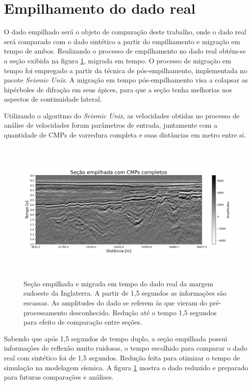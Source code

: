\documentclass[
	12pt,				%
	openright,			%
	oneside,			%
	a4paper,			%
	english,			%
	brazil				%
	]{abntex2}
\begin{document}
\section{Empilhamento do dado real}

	O dado empilhado será o objeto de comparação deste trabalho, onde o dado real será comparado com o dado sintético a partir do empilhamento e migração em tempo de ambos. Realizando o processo de empilhamento no dado real obtém-se a seção exibida na figura \ref{empilhamentoReal}, migrada em tempo. O processo de migração em tempo foi empregado a partir da técnica de  pós-empilhamento, implementada no pacote \textit{Seismic Unix}. A migração em tempo pós-empilhamento visa a colapsar as hipérboles de difração em seus ápices, para que a seção tenha melhorias nos aspectos de continuidade lateral. 
	
	\newpage 
	Utilizando o algoritmo do \textit{Seismic Unix}, as velocidades obtidas no processo de análise de velocidades foram parâmetros de entrada, juntamente com a quantidade de CMPs de varredura completa e suas distâncias em metro entre si. 

	\begin{figure}[htp!]
		\centering
		\includegraphics[width=16cm,height=7cm]{../imagens/sectionReduced.png}
		\caption{Seção empilhada e migrada em tempo do dado real da margem sudoeste da Inglaterra. A partir de 1,5 segundos as informações são escassas. As amplitudes do dado se referem às que vieram do pré-processamento desconhecido. Redução até o tempo 1,5 segundos para efeito de comparação entre seções.}
		\label{empilhamentoReal}
	\end{figure}	

	Sabendo que após 1,5 segundos de tempo duplo, a seção empilhada possui informações de reflexão muito ruidosas, o tempo escolhido para comparar o dado real com sintético foi de 1,5 segundos. Redução feita para otimizar o tempo de simulação na modelagem sísmica. A figura \ref{empilhamentoReal} mostra o dado reduzido e preparado para futuras comparações e análises. 
\end{document}
